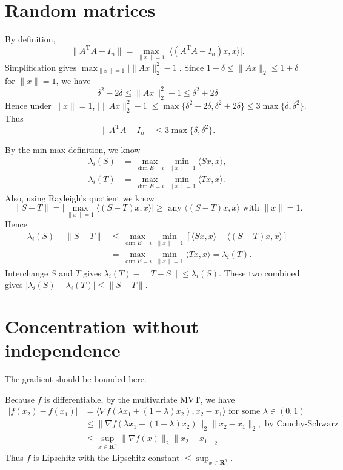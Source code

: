 \documentclass[11pt]{article}
\newcommand{\R}{\mathbf{R}}
\newcommand{\inp}[2]{\langle #1, #2 \rangle}
\newcommand{\nm}[1]{\lVert #1 \rVert}
\newcommand{\abs}[1]{\lvert #1 \rvert}
\newcommand{\trp}{\mathrm T}
\theoremstyle{plain}
\theoremstyle{definition}
\theoremstyle{remark}
\theoremstyle{definition}
\newenvironment{mansol}[1]{%
  \renewcommand\themansolinner{#1}%
  \mansolinner
}{\endmansolinner}
\begin{document}
\newpage
\section{Random matrices}
\begin{mansol}{4.1.6}
By definition, \[\nm{A^\trp A - I_n} = \max_{\nm{x} = 1} \abs{\inp{(A^\trp A - I_n) x}{x}}.\]
Simplification gives $\max_{\nm{x} = 1} \big\lvert\nm{Ax}_2^2 - 1\big\rvert$. Since $1 - \delta \leq \nm{Ax}_2 \leq 1 + \delta$ for $\nm{x} = 1$, we have \[
\delta^2 - 2 \delta \leq \nm{Ax}_2^2 - 1 \leq \delta^2 + 2 \delta
\]
Hence under $\nm{x} = 1$, $\big\lvert\nm{Ax}_2^2 - 1\big\rvert \leq \max\{\delta^2 - 2\delta, \delta^2 + 2 \delta\} \leq 3 \max\{\delta, \delta^2\}$. Thus \[\nm{A^\trp A - I_n} \leq 3 \max\{\delta,\delta^2\}.\]
\end{mansol}

\begin{mansol}{4.5.3}[Weyl's inequality]
By the min-max definition, we know \begin{align*}
\lambda_i(S) & = \max_{\dim E = i} \min_{\nm{x} = 1} \inp{Sx}{x},\\
\lambda_i(T) & = \max_{\dim E = i} \min_{\nm{x} = 1} \inp{Tx}{x}.
\end{align*}
Also, using Rayleigh's quotient we know \[
\textstyle\nm{S-T} = \big\lvert\max_{\nm{x} = 1}\inp{(S-T)x}{x}\big\rvert \geq \text{ any } \inp{(S-T)x}{x} \text{ with }\nm{x} = 1.
\]
Hence \begin{align*}
\lambda_i(S) - \nm{S-T} & \leq \max_{\dim E = i} \min_{\nm{x} = 1} [\inp{Sx}{x} - \inp{(S-T)x}{x}] \\
& = \max_{\dim E = i} \min_{\nm{x} = 1} \inp{Tx}{x} = \lambda_i(T).
\end{align*}
Interchange $S$ and $T$ gives $\lambda_i(T) - \nm{T - S} \leq \lambda_i(S)$. These two combined gives $\abs{\lambda_i(S) - \lambda_i(T)} \leq \nm{S-T}$.
\end{mansol}

\section{Concentration without independence}
\begin{mansol}{5.1.2 (b)} The gradient should be bounded here.

Because $f$ is differentiable, by the multivariate MVT, we have \begin{align*}
\abs{f(x_2) - f(x_1)} & = \inp{\nabla f(\lambda x_1 + (1-\lambda) x_2)}{x_2 - x_1} \text{ for some }\lambda \in (0,1) \\ 
& \leq \nm{\nabla f(\lambda x_1 + (1-\lambda) x_2)}_2 \nm{x_2 - x_1}_2, \text{ by Cauchy-Schwarz} \\ 
& \leq \sup_{x \in \R^n}\nm{\nabla f(x)}_2 \nm{x_2 - x_1}_2
\end{align*}
Thus $f$ is Lipschitz with the Lipschitz constant $\leq \sup_{x \in \R^n}$.
\end{mansol}
\end{document}

